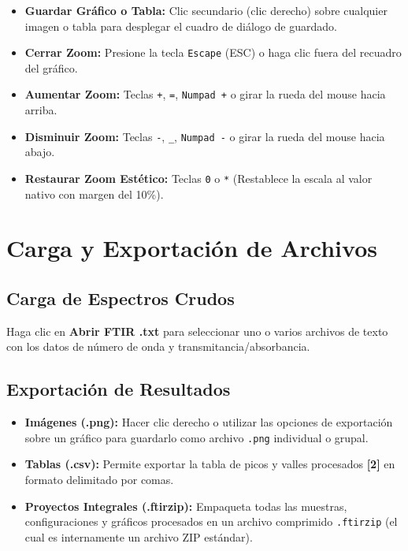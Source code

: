 \documentclass[11pt,a4paper]{article}
\begin{document}
\begin{tcolorbox}[colback=red!5!white,colframe=red!75!black,title=\textbf{Atajos de Teclado, Clics y Rueda del Mouse en Modo Zoom}]
\begin{itemize}[leftmargin=*]
    \item \textbf{Guardar Gráfico o Tabla:} Clic secundario (clic derecho) sobre cualquier imagen o tabla para desplegar el cuadro de diálogo de guardado.
    \item \textbf{Cerrar Zoom:} Presione la tecla \texttt{Escape} (ESC) o haga clic fuera del recuadro del gráfico.
    \item \textbf{Aumentar Zoom:} Teclas \texttt{+}, \texttt{=}, \texttt{Numpad +} o girar la rueda del mouse hacia arriba.
    \item \textbf{Disminuir Zoom:} Teclas \texttt{-}, \texttt{\_}, \texttt{Numpad -} o girar la rueda del mouse hacia abajo.
    \item \textbf{Restaurar Zoom Estético:} Teclas \texttt{0} o \texttt{*} (Restablece la escala al valor nativo con margen del 10\%).
\end{itemize}
\end{tcolorbox}

\section{Carga y Exportación de Archivos}

\subsection{Carga de Espectros Crudos}
Haga clic en \textbf{Abrir FTIR .txt} para seleccionar uno o varios archivos de texto con los datos de número de onda y transmitancia/absorbancia.

\subsection{Exportación de Resultados}
\begin{itemize}
    \item \textbf{Imágenes (.png):} Hacer clic derecho o utilizar las opciones de exportación sobre un gráfico para guardarlo como archivo \texttt{.png} individual o grupal.
    \item \textbf{Tablas (.csv):} Permite exportar la tabla de picos y valles procesados \textbf{[2]} en formato delimitado por comas.
    \item \textbf{Proyectos Integrales (.ftirzip):} Empaqueta todas las muestras, configuraciones y gráficos procesados en un archivo comprimido \texttt{.ftirzip} (el cual es internamente un archivo ZIP estándar).
\end{itemize}
\end{document}
